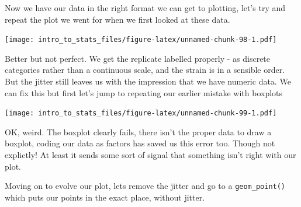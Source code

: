 \documentclass[
]{book}
\newenvironment{Shaded}{\begin{snugshade}}{\end{snugshade}}
\newcommand{\DataTypeTok}[1]{\textcolor[rgb]{0.13,0.29,0.53}{#1}}
\newcommand{\KeywordTok}[1]{\textcolor[rgb]{0.13,0.29,0.53}{\textbf{#1}}}
\newcommand{\NormalTok}[1]{#1}
\newcommand{\OperatorTok}[1]{\textcolor[rgb]{0.81,0.36,0.00}{\textbf{#1}}}
\newcommand{\StringTok}[1]{\textcolor[rgb]{0.31,0.60,0.02}{#1}}
\begin{document}
Now we have our data in the right format we can get to plotting, let's try and repeat the plot we went for when we first looked at these data.

\begin{Shaded}
\end{Shaded}

\texttt{[image: intro\_to\_stats\_files/figure-latex/unnamed-chunk-98-1.pdf]}

Better but not perfect. We get the replicate labelled properly - as discrete categories rather than a continuous scale, and the strain is in a sensible order. But the jitter still leaves us with the impression that we have numeric data. We can fix this but first let's jump to repeating our earlier mistake with boxplots

\begin{Shaded}
\end{Shaded}

\texttt{[image: intro\_to\_stats\_files/figure-latex/unnamed-chunk-99-1.pdf]}

OK, weird. The boxplot clearly fails, there isn't the proper data to draw a boxplot, coding our data as factors has saved us this error too. Though not explictly! At least it sends some sort of signal that something isn't right with our plot.

Moving on to evolve our plot, lets remove the jitter and go to a \texttt{geom\_point()} which puts our points in the exact place, without jitter.

\begin{Shaded}
\end{Shaded}
\end{document}
